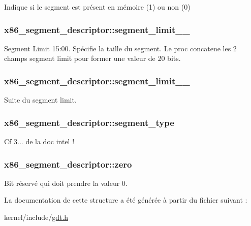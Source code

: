 Indique si le segment est présent en mémoire (1) ou non (0) \hypertarget{structx86__segment__descriptor_af9516f6d07c24ddedde31235b05b62c2}{
\subsubsection[{segment\-\_\-limit\-\_\-15\-\_\-0}]{ x86\-\_\-segment\-\_\-descriptor\-::segment\-\_\-limit\-\_\-\_}}\label{structx86__segment__descriptor_af9516f6d07c24ddedde31235b05b62c2}
Segment Limit 15\-:00. Spécifie la taille du segment. Le proc concatene les 2 champs segment limit pour former une valeur de 20 bits. \hypertarget{structx86__segment__descriptor_a6ab37b8f7730fe67af946725a3dd064a}{
\subsubsection[{segment\-\_\-limit\-\_\-19\-\_\-16}]{ x86\-\_\-segment\-\_\-descriptor\-::segment\-\_\-limit\-\_\-\_}}\label{structx86__segment__descriptor_a6ab37b8f7730fe67af946725a3dd064a}
Suite du segment limit. \hypertarget{structx86__segment__descriptor_ab3ef0c9fce1e74ee6549bbce5ea6f25f}{
\subsubsection[{segment\-\_\-type}]{ x86\-\_\-segment\-\_\-descriptor\-::segment\-\_\-type}}\label{structx86__segment__descriptor_ab3ef0c9fce1e74ee6549bbce5ea6f25f}
Cf 3... de la doc intel ! \hypertarget{structx86__segment__descriptor_a4cbd016599f85d6a2060c31d7714dbbd}{
\subsubsection[{zero}]{ x86\-\_\-segment\-\_\-descriptor\-::zero}}\label{structx86__segment__descriptor_a4cbd016599f85d6a2060c31d7714dbbd}
Bit réservé qui doit prendre la valeur 0. 

La documentation de cette structure a été générée à partir du fichier suivant \-:\begin{DoxyCompactItemize}
\item 
kernel/include/\hyperlink{gdt_8h}{gdt.\-h}\end{DoxyCompactItemize}
